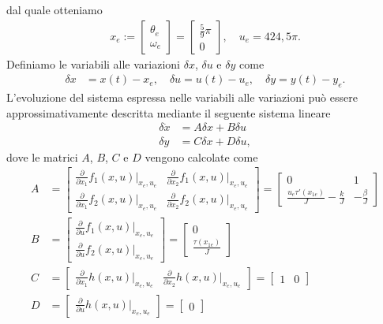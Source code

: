 \documentclass[a4paper, 11pt]{article}
\begin{document}
	dal quale otteniamo
	\begin{align}
		x_e := \begin{bmatrix}
			\theta_e \\
			\omega_e
		\end{bmatrix} = \begin{bmatrix}
			\frac{5}{9}\pi \\
			0
		\end{bmatrix},  \quad u_e = 424,5 \pi.\label{eq:equilibirum_pair}
	\end{align}
	Definiamo le variabili alle variazioni $\delta x$, $\delta u$ e $\delta y$ come 
	\begin{align*}
		\delta x &= x(t) - x_e, 
		\quad
		\delta u = u(t) - u_e, 
		\quad
		\delta y = y(t) - y_e.
	\end{align*}
	L'evoluzione del sistema espressa nelle variabili alle variazioni pu\`o essere approssimativamente descritta mediante il seguente sistema lineare
	\begin{subequations}\label{eq:linearized_system}
		\begin{align}
			\delta \dot{x} &= A\delta x + B\delta u
			\\
			\delta y &= C\delta x + D\delta u,
		\end{align}
	\end{subequations}
	dove le matrici $A$, $B$, $C$ e $D$ vengono calcolate come
	\newcommand{\pdv}[2]{\frac{\partial}{\partial #1}#2(x,u)|_{x_e,u_e}}
	\begin{subequations}\label{eq:matrices}
		\begin{align}
			A &=\begin{bmatrix}
				\pdv{x_1}{f_1} & \pdv{x_2}{f_1} \\
				\pdv{x_1}{f_2} & \pdv{x_2}{f_2}
			\end{bmatrix} = \begin{bmatrix}
				0 & 1 \\
				\frac{u_e\tau'(x_{1e})}{J} - \frac{k}{J} & - \frac{\beta}{J}
			\end{bmatrix}
			\\
			B &=\begin{bmatrix}
				\pdv{u}{f_1} \\
				\pdv{u}{f_2}
			\end{bmatrix} = \begin{bmatrix}
				0 \\
				\frac{\tau(x_{1e})}{J}
			\end{bmatrix}
			\\
			C &=\begin{bmatrix}
				\pdv{x_1}{h} & \pdv{x_2}{h}
			\end{bmatrix} = \begin{bmatrix}
				1 & 0
			\end{bmatrix}
			\\
			D &= \begin{bmatrix}
				\pdv{u}{h}
			\end{bmatrix} = \begin{bmatrix}
				0
			\end{bmatrix}
		\end{align}
	\end{subequations}
\end{document}
